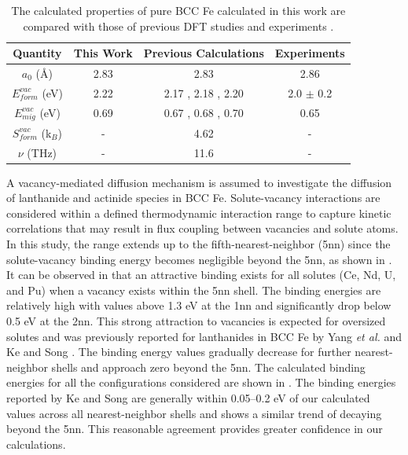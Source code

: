 \documentclass[preprint,12pt]{elsarticle}
\begin{document}
\begin{table}[!h]
    \centering
    \caption{The calculated properties of pure BCC Fe calculated in this work are compared with those of previous DFT studies \cite{messina_exact_2014,murali_bcc_fe_2015, yang_significant_2023, messina_systematic_2016, Li_magnetic_2021,  choudhury2011ab} and experiments \cite{kittel2018introduction, schepper_positron1983, tapasa2007computer}. } 
    \label{tab:bulk_properties}
    \begin{tabular}{|c|c|c|c|}
       \hline
       Quantity& This Work& Previous Calculations  & Experiments  \\
       \hline
       $a_0$ (\AA)& 2.83 & 2.83 \cite{messina_exact_2014, yang_significant_2023}  & 2.86 \cite{kittel2018introduction} \\
       \hline
       $E_{form}^{vac}$ (eV)&2.22 &2.17 \cite{yang_significant_2023}, 2.18 \cite{messina_exact_2014, SHANG2016128}, 2.20 \cite{murali_bcc_fe_2015, Li_magnetic_2021}& 2.0 $\pm$ 0.2 \cite{schepper_positron1983} \\
       \hline
       $E_{mig}^{vac}$ (eV) &0.69 & 0.67 \cite{choudhury2011ab}, 0.68 \cite{murali_bcc_fe_2015}, 0.70 \cite{messina_exact_2014, yang_significant_2023} &  0.65 \cite{tapasa2007computer} \\
       \hline
       $S_{form}^{vac}$ (k$_B$) &- & 4.62 \cite{messina_systematic_2016} &- \\
       \hline
       $\nu$ (THz) &- & 11.6 \cite{messina_systematic_2016} &- \\
       \hline
    \end{tabular}
\end{table}


A vacancy-mediated diffusion mechanism is assumed to investigate the diffusion of lanthanide and actinide species in BCC Fe. Solute-vacancy interactions are considered within a defined thermodynamic interaction range to capture kinetic correlations that may result in flux coupling between vacancies and solute atoms. In this study, the range extends up to the fifth-nearest-neighbor (5nn) since the solute-vacancy binding energy becomes negligible beyond the 5nn, as shown in . It can be observed in  that an attractive binding exists for all solutes (Ce, Nd, U, and Pu) when a vacancy exists within the 5nn shell. The binding energies are relatively high with values above 1.3 eV at the 1nn and significantly drop below 0.5 eV at the 2nn. This strong attraction to vacancies is expected for oversized solutes and was previously reported for lanthanides in BCC Fe by Yang \textit{et al.} \cite{yang_significant_2023} and Ke and Song \cite{ke2025diffusion}. The binding energy values gradually decrease for further nearest-neighbor shells and approach zero beyond the 5nn. The calculated binding energies for all the configurations considered are shown in . The binding energies reported by Ke and Song \cite{ke2025diffusion} are generally within 0.05–0.2 eV of our calculated values across all nearest-neighbor shells and shows a similar trend of decaying beyond the 5nn. This reasonable agreement provides greater confidence in our calculations.
\end{document}
